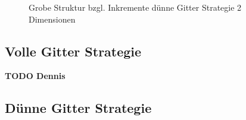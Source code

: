 \documentclass[a4paper,12pt]{llncs}
\numberwithin{equation}{section}
\begin{document}
\begin{figure}
	\caption{Grobe Struktur bzgl. Inkremente dünne Gitter Strategie 2 Dimensionen}
	\label{fig:sparseGrid01}
\end{figure}

\subsection{Volle Gitter Strategie}
\textbf{TODO Dennis}

\subsection{Dünne Gitter Strategie}
\end{document}
